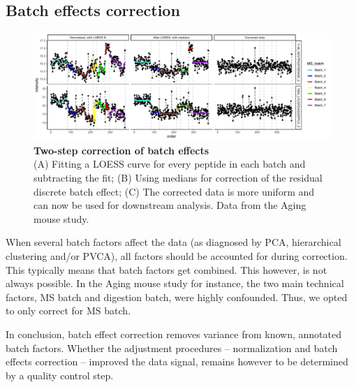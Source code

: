 \documentclass[num-refs]{wiley-article}
\begin{document}
\subsection{Batch effects correction}
\begin{figure}[hbt]
	\includegraphics[width=\textwidth]{figures/Fig5_batch_correction.pdf}
	
	\caption{\textbf{Two-step correction of batch effects}  \\
		\footnotesize
		(A) Fitting a LOESS curve for every peptide in each batch and subtracting the fit; (B) Using medians for correction of the residual discrete batch effect; (C) The corrected data is more uniform and can now be used for downstream analysis. Data from the Aging mouse study.}
	\label{fig:batch_fig5_batchCorrection}
\end{figure}

When several batch factors affect the data (as diagnosed by PCA, hierarchical clustering and/or PVCA), all factors should be accounted for during correction. This typically means that batch factors get combined. This however, is not always possible. In the Aging mouse study for instance, the two main technical factors, MS batch and digestion batch, were highly confounded. Thus, we opted to only correct for MS batch.

In conclusion, batch effect correction removes variance from known, annotated batch factors. Whether the adjustment procedures – normalization and batch effects correction – improved the data signal, remains however to be determined by a quality control step.
\end{document}
